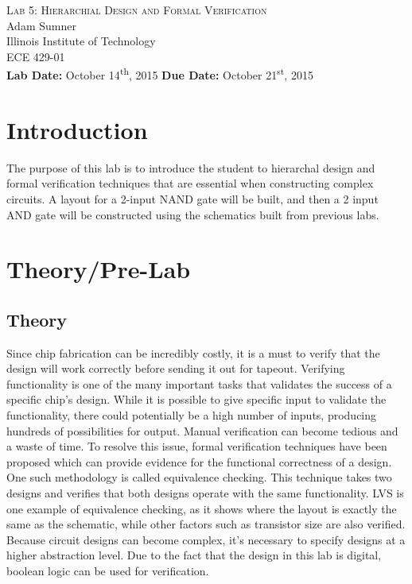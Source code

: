 \documentclass[12pt]{article}
\begin{document}
\begin{titlepage}
	\begin{center}
		
		
		\vfill
		
		\textsc{\LARGE Lab 5: Hierarchial Design and Formal Verification}\\[1.5cm]
		
		\Large Adam Sumner\\[0.5cm]
		
		\Large Illinois Institute of Technology\\[0.5cm]
		
		\Large ECE 429-01\\[0.5cm]	
		
		\noindent
		\vfill
		\large \textbf{Lab Date:} October 14\textsuperscript{th}, 2015\hfill
		\large \textbf{Due Date:} October 21\textsuperscript{st}, 2015
	
		
	\end{center}
\end{titlepage}

\section{Introduction}
The purpose of this lab is to introduce the student to hierarchal design and formal verification techniques that are essential when constructing complex circuits. A layout for a 2-input NAND gate will be built, and then a 2 input AND gate will be constructed using the schematics built from previous labs.
\section{Theory/Pre-Lab}
\subsection{Theory}
Since chip fabrication can be incredibly costly, it is a must to verify that the design will work correctly before sending it out for tapeout. Verifying functionality is one of the many important tasks that validates the success of a specific chip's design. While it is possible to give specific input to validate the functionality, there could potentially be a high number of inputs, producing hundreds of possibilities for output. Manual verification can become tedious and a waste of time. To resolve this issue, formal verification techniques have been proposed which can provide evidence for the functional correctness of a design. One such methodology is called equivalence checking. This technique takes two designs and verifies that both designs operate with the same functionality. LVS is one example of equivalence checking, as it shows where the layout is exactly the same as the schematic, while other factors such as transistor size are also verified. Because circuit designs can become complex, it's necessary to specify designs at a higher abstraction level. Due to the fact that the design in this lab is digital, boolean logic can be used for verification.
\end{document}
